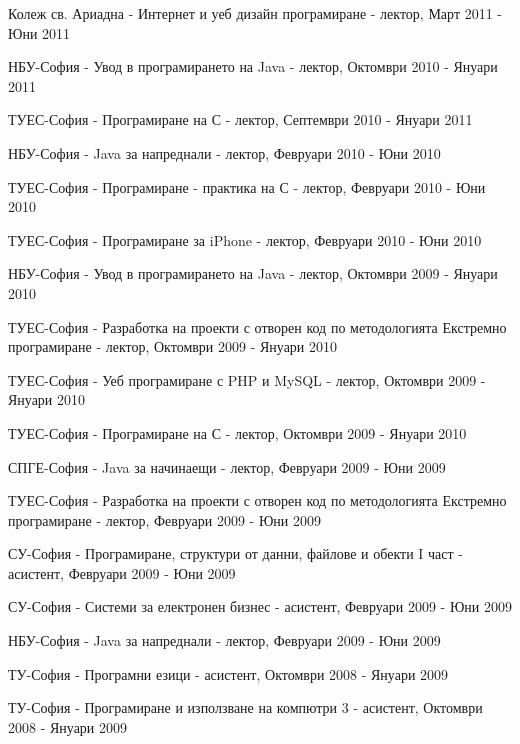 \documentclass[bulgarian,a4paper]{europasscv}
\begin{document}
\begin{europasscv}
{\begin{ecvitemize}
    \item Колеж св. Ариадна - Интернет и уеб дизайн програмиране - лектор, Март 2011 - Юни 2011
    \item НБУ-София - Увод в програмирането на Java - лектор, Октомври 2010 - Януари 2011
    \item ТУЕС-София - Програмиране на С - лектор, Септември 2010 - Януари 2011
    \item НБУ-София - Java за напреднали - лектор, Февруари 2010 - Юни 2010
    \item ТУЕС-София - Програмиране - практика на С - лектор, Февруари 2010 - Юни 2010
    \item ТУЕС-София - Програмиране за iPhone - лектор, Февруари 2010 - Юни 2010
    \item НБУ-София - Увод в програмирането на Java - лектор, Октомври 2009 - Януари 2010
    \item ТУЕС-София - Разработка на проекти с отворен код по методологията Екстремно програмиране - лектор, Октомври 2009 - Януари 2010
    \item ТУЕС-София - Уеб програмиране с PHP и MySQL - лектор, Октомври 2009 - Януари 2010
    \item ТУЕС-София - Програмиране на С - лектор, Октомври 2009 - Януари 2010
    \item СПГЕ-София - Java за начинаещи - лектор, Февруари 2009 - Юни 2009
    \item ТУЕС-София - Разработка на проекти с отворен код по методологията Екстремно програмиране - лектор, Февруари 2009 - Юни 2009
    \item СУ-София - Програмиране, структури от данни, файлове и обекти I част - асистент, Февруари 2009 - Юни 2009
    \item СУ-София - Системи за електронен бизнес - асистент, Февруари 2009 - Юни 2009
    \item НБУ-София - Java за напреднали - лектор, Февруари 2009 - Юни 2009
    \item ТУ-София - Програмни езици - асистент, Октомври 2008 - Януари 2009
    \item ТУ-София - Програмиране и използване на компютри 3 - асистент, Октомври 2008 - Януари 2009
  \end{ecvitemize}}
  
  
  \end{europasscv}
\end{document}
